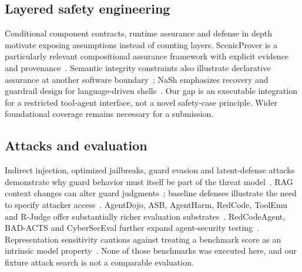 ﻿\documentclass[lettersize,journal]{IEEEtran}
\begin{document}
\subsection{Layered safety engineering}
Conditional component contracts, runtime assurance and defense in depth
motivate exposing assumptions instead of counting layers. ScenicProver is a
particularly relevant compositional assurance framework with explicit evidence
and provenance~\cite{arxiv251102164}. Semantic integrity constraints also
illustrate declarative assurance at another software
boundary~\cite{arxiv250300600}; NaSh emphasizes recovery and guardrail design
for language-driven shells~\cite{arxiv250613028}. Our gap is an executable
integration for a restricted tool-agent interface, not a novel safety-case
principle. Wider foundational coverage remains necessary for a submission.

\subsection{Attacks and evaluation}
Indirect injection, optimized jailbreaks, guard evasion and latent-defense
attacks demonstrate why guard behavior must itself be part of the threat
model~\cite{arxiv230212173,arxiv230715043,arxiv250411168,arxiv241209565,arxiv250305264}.
RAG context changes can alter guard judgments~\cite{arxiv251005310}; baseline
defenses illustrate the need to specify attacker access~\cite{arxiv230900614}.
AgentDojo, ASB, AgentHarm, RedCode, ToolEmu and R-Judge offer substantially
richer evaluation substrates~\cite{arxiv240613352,arxiv241002644,arxiv241009024,arxiv241107781,arxiv230915817,arxiv240110019}.
RedCodeAgent, BAD-ACTS and CyberSecEval further expand agent-security
testing~\cite{arxiv251002609,arxiv250816481,arxiv240801605}.
Representation sensitivity cautions against treating a benchmark score as an
intrinsic model property~\cite{arxiv261003585}. None of those benchmarks was
executed here, and our fixture attack search is not a comparable evaluation.
\end{document}
